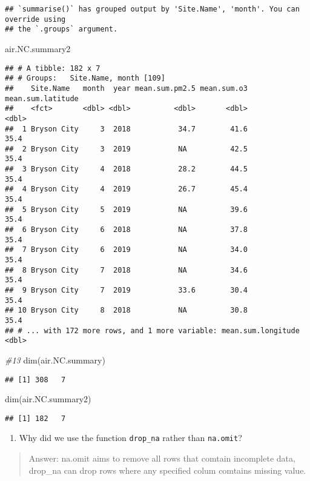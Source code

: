 \documentclass[
]{article}
\newenvironment{Shaded}{\begin{snugshade}}{\end{snugshade}}
\newcommand{\CommentTok}[1]{\textcolor[rgb]{0.56,0.35,0.01}{\textit{#1}}}
\newcommand{\FunctionTok}[1]{\textcolor[rgb]{0.00,0.00,0.00}{#1}}
\newcommand{\NormalTok}[1]{#1}
\providecommand{\tightlist}{%
  \setlength{\itemsep}{0pt}\setlength{\parskip}{0pt}}
\begin{document}
\begin{verbatim}
## `summarise()` has grouped output by 'Site.Name', 'month'. You can override using
## the `.groups` argument.
\end{verbatim}

\begin{Shaded}
\begin{Highlighting}[]
\NormalTok{air.NC.summary2}
\end{Highlighting}
\end{Shaded}

\begin{verbatim}
## # A tibble: 182 x 7
## # Groups:   Site.Name, month [109]
##    Site.Name   month  year mean.sum.pm2.5 mean.sum.o3 mean.sum.latitude
##    <fct>       <dbl> <dbl>          <dbl>       <dbl>             <dbl>
##  1 Bryson City     3  2018           34.7        41.6              35.4
##  2 Bryson City     3  2019           NA          42.5              35.4
##  3 Bryson City     4  2018           28.2        44.5              35.4
##  4 Bryson City     4  2019           26.7        45.4              35.4
##  5 Bryson City     5  2019           NA          39.6              35.4
##  6 Bryson City     6  2018           NA          37.8              35.4
##  7 Bryson City     6  2019           NA          34.0              35.4
##  8 Bryson City     7  2018           NA          34.6              35.4
##  9 Bryson City     7  2019           33.6        30.4              35.4
## 10 Bryson City     8  2018           NA          30.8              35.4
## # ... with 172 more rows, and 1 more variable: mean.sum.longitude <dbl>
\end{verbatim}

\begin{Shaded}
\begin{Highlighting}[]
\CommentTok{\#13}
\FunctionTok{dim}\NormalTok{(air.NC.summary)}
\end{Highlighting}
\end{Shaded}

\begin{verbatim}
## [1] 308   7
\end{verbatim}

\begin{Shaded}
\begin{Highlighting}[]
\FunctionTok{dim}\NormalTok{(air.NC.summary2)}
\end{Highlighting}
\end{Shaded}

\begin{verbatim}
## [1] 182   7
\end{verbatim}

\begin{enumerate}
\def\labelenumi{\arabic{enumi}.}
\setcounter{enumi}{13}
\tightlist
\item
  Why did we use the function \texttt{drop\_na} rather than
  \texttt{na.omit}?
\end{enumerate}

\begin{quote}
Answer: na.omit aims to remove all rows that comtain incomplete data,
drop\_na can drop rows where any specified colum comtains missing value.
\end{quote}
\end{document}
